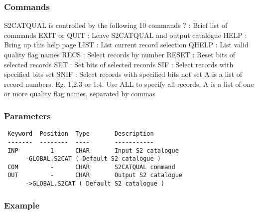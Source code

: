 \documentclass{book}
\renewcommand{\_}{{\tt\char'137}}     %
\begin{document}
\subsubsection{Commands}
S2CATQUAL is controlled by the following 10 commands
? : Brief list of commands
EXIT or QUIT : Leave S2CATQUAL and output catalogue
HELP : Bring up this help page
LIST  : List current record selection
QHELP : List valid quality flag names
RECS  : Select records by number
RESET  : Reset bits of selected records
SET  : Set bits of selected records
SIF  : Select records with specified bits set
SNIF  : Select records with specified bits not set
A  is a list of record numbers. Eg. 1,2,3 or 1:4. Use
ALL to specify all records.
A  is a list of one or more quality flag names, separated by
commas
\subsubsection{Parameters}
\begin{verbatim}
 Keyword  Position  Type       Description
 -------  --------  ----       -----------
 INP         1      CHAR       Input S2 catalogue
      -GLOBAL.S2CAT ( Default S2 catalogue )
 COM         -      CHAR       S2CATQUAL command
 OUT         -      CHAR       Output S2 catalogue
      ->GLOBAL.S2CAT ( Default S2 catalogue )
\end{verbatim}\subsubsection{Example}
\end{document}
